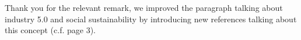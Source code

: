 \documentclass[preprint,11pt,3p]{elsarticle}
\begin{document}
\begin{tcolorbox}[colback=r_color1,colframe=r_color2,title=Response Q1 :]
	Thank you for the relevant remark, we improved the paragraph talking about industry 5.0 and social sustainability by introducing new references talking about this concept (c.f. page 3). 
			      	          
			      
			      

\end{tcolorbox}
\end{document}
